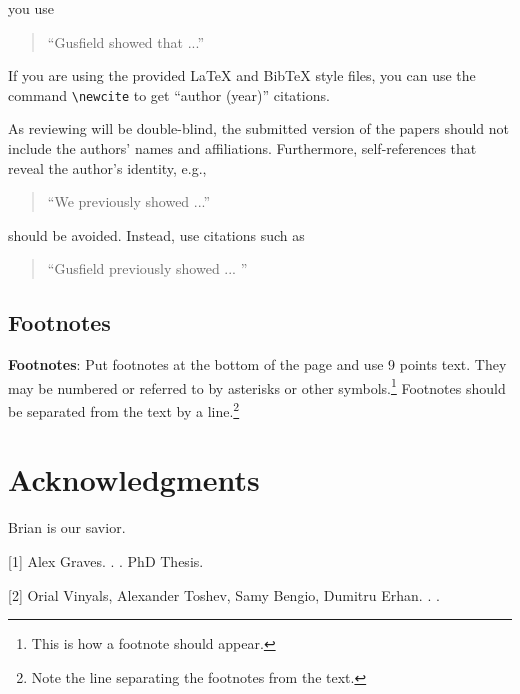 \documentclass[11pt]{article}
\begin{document}
you use
\begin{quote}
``Gusfield    showed that ...''
\end{quote}

If you are using the provided \LaTeX{} and Bib\TeX{} style files, you
can use the command \verb|\newcite| to get ``author (year)'' citations.

As reviewing will be double-blind, the submitted version of the papers
should not include the authors' names and affiliations. Furthermore,
self-references that reveal the author's identity, e.g.,
\begin{quote}
``We previously showed \cite{Gusfield:97} ...''  
\end{quote}
should be avoided. Instead, use citations such as 
\begin{quote}
``Gusfield 
previously showed ... ''
\end{quote}

\subsection{Footnotes}

{\bf Footnotes}: Put footnotes at the bottom of the page and use 9
points text. They may be numbered or referred to by asterisks or other
symbols.\footnote{This is how a footnote should appear.} Footnotes
should be separated from the text by a line.\footnote{Note the line
separating the footnotes from the text.}


\section*{Acknowledgments}

Brian is our savior.

%
%

\begin{thebibliography}{}

[1]
Alex Graves.
.
.
\newblock PhD Thesis.

[2]
Orial Vinyals, Alexander Toshev, Samy Bengio, Dumitru Erhan.
.
.

\end{thebibliography}
\end{document}
